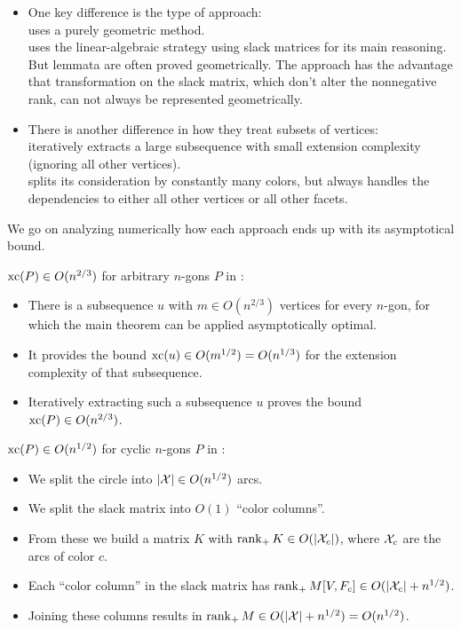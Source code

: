 \begin{itemize}
  \item One key difference is the type of approach:\\
  \cite{shitov2020sublinear} uses a purely geometric method.\\
  \cite{kwan2020extension} uses the linear-algebraic strategy using slack matrices for its main reasoning. But lemmata are often proved geometrically. The approach has the advantage that transformation on the slack matrix, which don't alter the nonnegative rank, can not always be represented geometrically.

  \item There is another difference in how they treat subsets of vertices:\\
  \cite{shitov2020sublinear} iteratively extracts a large subsequence with small extension complexity (ignoring all other vertices).\\
  \cite{kwan2020extension} splits its consideration by constantly many colors, but always handles the dependencies to either all other vertices or all other facets. 
\end{itemize}

We go on analyzing numerically how each approach ends up with its asymptotical bound.

$\operatorname{xc}(P) \in O(n^{2/3})$ for arbitrary $n$-gons $P$ in \cite{shitov2020sublinear}:
\begin{itemize}
  \item There is a subsequence $u$ with $m \in O(n^{2/3})$ vertices for every $n$-gon, for which the main theorem can be applied asymptotically optimal.
  \item It provides the bound $\operatorname{xc}(u) \in O(m^{1/2}) = O(n^{1/3})$ for the extension complexity of that subsequence. 
  \item Iteratively extracting such a subsequence $u$ proves the bound $\operatorname{xc}(P) \in O(n^{2/3})$.
\end{itemize}

$\operatorname{xc}(P) \in O(n^{1/2})$ for cyclic $n$-gons $P$ in \cite{kwan2020extension}:
\begin{itemize}
  \item We split the circle into $\lvert\mathcal{X}\rvert \in O(n^{1/2})$ arcs.
  \item We split the slack matrix into $O(1)$ ``color columns''.
  \item From these we build a matrix $K$ with $\operatorname{rank}_+ K \in O(\lvert\mathcal{X}_c\rvert)$, where $\mathcal{X}_c$ are the arcs of color $c$.
  \item Each ``color column'' in the slack matrix has $\operatorname{rank}_+ M[V,F_c] \in O(\lvert\mathcal{X}_c\rvert + n^{1/2})$.
  \item Joining these columns results in $\operatorname{rank}_+ M \in O(\lvert\mathcal{X}\rvert + n^{1/2}) = O(n^{1/2})$.
\end{itemize}

